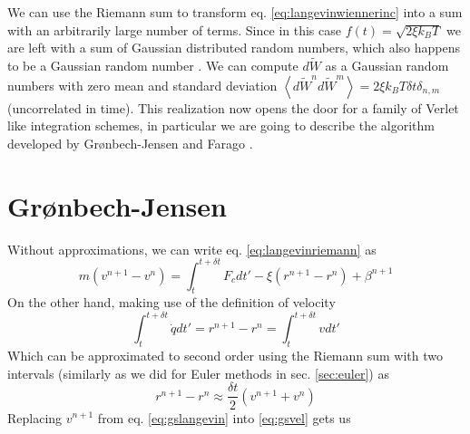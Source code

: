 \documentclass[ twoside,openright,titlepage,numbers=noenddot,%
headinclude,footinclude,cleardoublepage=empty,abstract=on,
BCOR=5mm,paper=a4,fontsize=11pt, dvipsnames
]{scrreprt}
\newcommand{\dt}{\delta t}
\newcommand{\kT}{k_B T}
\newcommand{\noise}{\widetilde{W}}
\newcommand{\ppos}{q}
\begin{document}
We can use the Riemann sum to transform eq. \eqref{eq:langevinwiennerinc} into a sum with an arbitrarily large number of terms. Since in this case $f(t) = \sqrt{2\xi\kT}$ we are left with a sum of Gaussian distributed random numbers, which also happens to be a Gaussian random number . We can compute $d\noise$ as a Gaussian random numbers with zero mean and standard deviation $\left\langle d\noise^nd\noise^m\right\rangle = 2\xi\kT\dt\delta_{n,m}$ (uncorrelated in time).
This realization now opens the door for a family of Verlet like integration schemes, in particular we are going to describe the algorithm developed by Grønbech-Jensen and Farago \cite{Gronbech2013}.

\section{Grønbech-Jensen}\label{sec:gronbechjensen}
Without approximations, we can write eq. \eqref{eq:langevinriemann} as
\begin{equation}
  \label{eq:gslangevin}
  m\left(v^{n+1}-v^n\right) = \int_t^{t+\dt}F_c dt' - \xi\left(r^{n+1}-r^n\right) + \beta^{n+1}
\end{equation}
On the other hand, making use of the definition of velocity
\begin{equation}
  \int_t^{t+\dt}\dot{\ppos}dt' = r^{n+1} - r^n = \int_t^{t+\dt}vdt'
\end{equation}
Which can be approximated to second order using the Riemann sum with two intervals (similarly as we did for Euler methods in sec. \ref{sec:euler}) as
\begin{equation}
  \label{eq:gsvel}
  r^{n+1} - r^n \approx \frac{\dt}{2}\left(v^{n+1}+v^n\right)
\end{equation}
Replacing $v^{n+1}$ from eq. \eqref{eq:gslangevin} into \eqref{eq:gsvel} gets us
\end{document}
